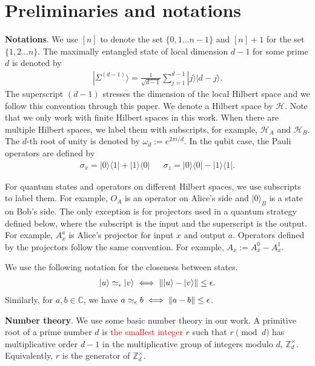 \documentclass[11pt,letterpaper]{article}
\newcommand{\ket}[1]{|#1\rangle}
\newcommand{\ketbra}[2]{|#1\rangle\langle#2|}
\DeclarePairedDelimiter{\norm}{\lVert}{\rVert}
\newcommand{\C}{\mathbb{C}}
\newcommand{\Z}{\mathbb{Z}}
\newcommand{\calH}{\mathcal{H}}
\newcommand{\Zd}{\Z_d^{\times}}
\newcommand{\1}{\mathbb{1}}
\newcommand{\EPR}[1]{\Sigma^{(#1)}}
\newcommand{\paulix}{\sigma_x}
\newcommand{\pauliz}{\sigma_z}
\newcommand{\appd}[1]{\simeq_{#1}}
\newcommand{\hf}[1]{\textcolor{red}{#1}}
\theoremstyle{definition}
\begin{document}
\section{Preliminaries and notations}
\label{sec:prelim}
\textbf{Notations}.
We use $[n]$ to denote the set $\{0,1 \dots n-1\}$ and $[n]+1$ for the set $\{1,2 \dots n\}$.
The maximally entangled state of local dimension $d-1$ for some prime $d$ is denoted by
\begin{align}
\ket{\EPR{d-1}} = \frac{1}{\sqrt{d-1}} \sum_{j = 1}^{d-1} \ket{j}\ket{d-j}.
\end{align}
The superscript $(d-1)$ stresses the dimension of the local Hilbert space and we follow this convention through this paper.
We denote a Hilbert space by $\calH$. Note that we only work with finite Hilbert spaces in this work.
When there are multiple Hilbert spaces, we label them with subscripts, for example, $\calH_A$ and
$\calH_B$.
The $d$-th root of unity is denoted by $\omega_d:=e^{2\pi i/d}$. In the qubit case, the Pauli operators
are defined by
\begin{align}
	\paulix = \ketbra{0}{1}+\ketbra{1}{0} && \pauliz = \ketbra{0}{0} - \ketbra{1}{1}.
\end{align}

For quantum states and operators on different Hilbert spaces, we use subscripts to label them.
For example, $O_A$ is an operator on Alice's side and $\ket{0}_{B}$ is a state on Bob's side. 
The only exception is for projectors used in a quantum strategy defined below, where the subscript 
is the input and the superscript is the output. For example, $A_x^a$ is Alice's projector for input $x$ and output $a$.
Operators defined by the projectors follow the same convention. For example, $A_x := A_x^0 - A_x^1$.

We use the following notation for the closeness between states.
\begin{align}
	\ket{u} \appd{\epsilon} \ket{v} \iff \norm{\ket{u} - \ket{v}} \leq \epsilon. 
\end{align}
Similarly, for $a,b \in \C$, we have
$a \appd{\epsilon} b \iff \norm{a-b} \leq \epsilon$.


\textbf{Number theory}.
We use some basic number theory in our work. A primitive root of a prime number
$d$ is \hf{the smallest integer} $r$ such that $r \pmod{d}$ has multiplicative order $d-1$
in the multiplicative group of integers modulo $d$, $\Zd$. Equivalently,
$r$ is the generator of $\Zd$.
\end{document}
